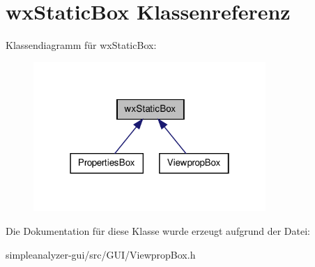 \hypertarget{classwxStaticBox}{\section{wx\-Static\-Box Klassenreferenz}
\label{classwxStaticBox}
}


Klassendiagramm für wx\-Static\-Box\-:
\nopagebreak
\begin{figure}[H]
\begin{center}
\leavevmode
\includegraphics[width=250pt]{classwxStaticBox__inherit__graph}
\end{center}
\end{figure}


Die Dokumentation für diese Klasse wurde erzeugt aufgrund der Datei\-:\begin{DoxyCompactItemize}
\item 
simpleanalyzer-\/gui/src/\-G\-U\-I/Viewprop\-Box.\-h\end{DoxyCompactItemize}
